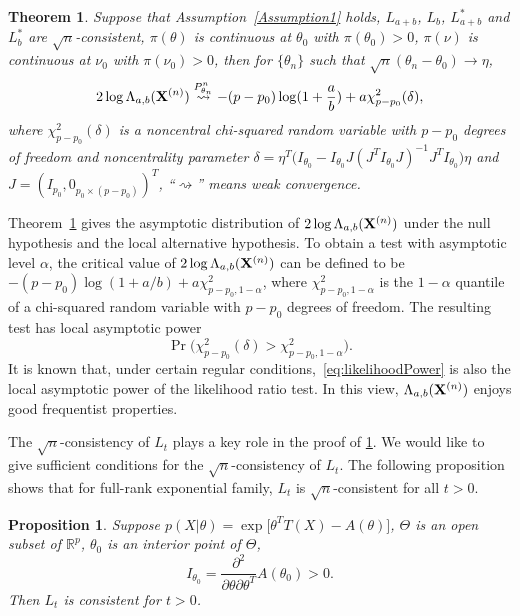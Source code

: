\documentclass[3p]{elsarticle}
\theoremstyle{plain}
\newtheorem{theorem}{\quad\quad Theorem}
\newtheorem{proposition}{\quad\quad Proposition}
\theoremstyle{definition}
\theoremstyle{remark}
\begin{document}
    \begin{theorem}\label{Thm:maintheorem}
        Suppose that Assumption~\ref{Assumption1} holds, $L_{a+b}$, $L_b$, $L_{a+b}^*$ and $L_b^*$ are $\sqrt{n}$-consistent, $\pi(\theta)$ is continuous at $\theta_0$ with $\pi(\theta_0)>0$, $\pi(\nu)$ is continuous at $\nu_0$ with $\pi(\nu_0)>0$, then
        for $\{\theta_n\}$ such that $\sqrt{n}(\theta_n-\theta_0)\to \eta$, 
        $$
        2\log \Lambda_{a,b}(\mathbf{X}^{(n)})\overset{P^n_{\theta_n}}{\rightsquigarrow}-{(p-p_0)}\log (1+\frac{a}{b})+{a}\chi^2_{p-p_0}(\delta),
        $$
        where $\chi^2_{p-p_0}(\delta)$ is a noncentral chi-squared random variable with $p-p_0$ degrees of freedom and noncentrality parameter $\delta=\eta^T\big( I_{\theta_0}-I_{\theta_0} J(J^T I_{\theta_0} J)^{-1}J^T I_{\theta_0}\big)\eta$ and $J=(I_{p_0},0_{p_0\times(p-p_0)})^T$,
``$\rightsquigarrow$'' means weak convergence.
    \end{theorem}
Theorem~\ref{Thm:maintheorem} gives the asymptotic distribution of $2\log \Lambda_{a,b}(\mathbf{X}^{(n)})$ under the null hypothesis and the local alternative hypothesis.
To obtain a test with asymptotic level $\alpha$, the critical value of $2\log \Lambda_{a,b}(\mathbf{X}^{(n)})$ can be defined to be $-(p-p_0)\log (1+a/b)+ a\chi^2_{p-p_0,1-\alpha}$, where $\chi^2_{p-p_0,1-\alpha}$ is the $1-\alpha$ quantile of a chi-squared random variable with $p-p_0$ degrees of freedom.
The resulting test has local asymptotic power
\begin{equation}\label{eq:likelihoodPower}
\Pr \big( \chi^2_{p-p_0}(\delta)> \chi^2_{p-p_0,1-\alpha} \big).
\end{equation}
It is known that, under certain regular conditions,~\eqref{eq:likelihoodPower} is also the local asymptotic power of the likelihood ratio test. 
In this view, $\Lambda_{a,b}(\mathbf{X}^{(n)})$ enjoys good frequentist properties.


 The $\sqrt{n}$-consistency of $L_t$ plays a key role in the proof of \ref{Thm:maintheorem}.
We would like to give sufficient conditions for the $\sqrt{n}$-consistency of $L_t$.
 The following proposition shows that for full-rank exponential family, $L_t$ is $\sqrt{n}$-consistent for all $t>0$.
\begin{proposition}\label{exponentialCon}
    Suppose $p(X|\theta)=\exp\big[\theta^T T(X)-A(\theta)\big]$, $\Theta$ is an open subset of $\mathbb{R}^p$, $\theta_0$ is an interior point of $\Theta$, 
    $$I_{\theta_0}=\frac{\partial^2}{\partial \theta \partial \theta^T} A(\theta_0)>0.$$
    Then $L_{t}$ is consistent for $t>0$.
\end{proposition}
\end{document}
